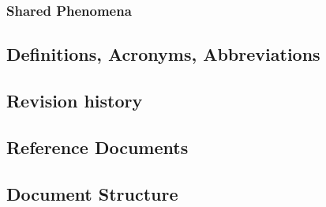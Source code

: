 \subsubsection{Shared Phenomena}

\subsection{Definitions, Acronyms, Abbreviations}

\subsection{Revision history}

\subsection{Reference Documents}

\subsection{Document Structure}
